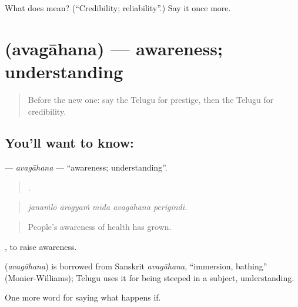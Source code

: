 \begin{tcolorbox}[breakable,colback=teal!4,colframe=teal!35!black,title={Before you move on}]
What does  mean? (\textquotedblleft{}Credibility; reliability\textquotedblright{}.) Say it once more.
\end{tcolorbox}
\section[\texorpdfstring{\te{అవగాహన} (avagāhana)}{అవగాహన (avagāhana)}]{ (avagāhana) — awareness; understanding}

\label{lesson:TE-C432-avagahana}



\begin{quote}
Before the new one: say the Telugu for prestige, then the Telugu for credibility.
\end{quote}

\subsection*{You'll want to know: }
\textbf{} — \emph{avagāhana} — \textquotedblleft{}awareness; understanding\textquotedblright{}.

\begin{quote}
    .
\end{quote}

\begin{quote}
\emph{janaṁlō ārōgyaṁ mīda avagāhana perigindi.}
\end{quote}

\begin{quote}
People’s awareness of health has grown.
\end{quote}

 , to raise awareness.

\begin{cousinweb}
\textbf{} (\emph{avagāhana}) is borrowed from Sanskrit \emph{avagāhana}, \textquotedblleft{}immersion, bathing\textquotedblright{} (Monier-Williams); Telugu uses it for being steeped in a subject, understanding.
\end{cousinweb}

\begin{grammarlens}[title={What you've built}]
One more word for saying what happens if.
\end{grammarlens}

